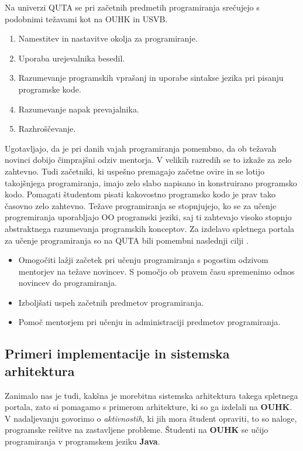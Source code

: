 Na univerzi QUTA se pri začetnih predmetih programiranja srečujejo s
podobnimi težavami kot na OUHK in USVB.

\begin{enumerate}
\tightlist
\item Namestitev in nastavitve okolja za programiranje.
\item Uporaba urejevalnika besedil.
\item Razumevanje programskih vprašanj in uporabe sintakse jezika pri
  pisanju programske kode.
\item Razumevanje napak prevajalnika.
\item Razhroščevanje.
\end{enumerate}

Ugotavljajo, da je pri danih vajah programiranja pomembno, da ob
težavah novinci dobijo čimprajšni odziv mentorja. V velikih razredih
se to izkaže za zelo zahtevno. Tudi začetniki, ki uspešno premagajo
začetne ovire in se lotijo takojšnjega programiranja, imajo zelo slabo
napisano in konstruirano programsko kodo. Pomagati študentom pisati
kakovostno programsko kodo je prav tako časovno zelo zahtevno. Težave
programiranja se stopnjujejo, ko se za učenje progremiranja uporabljajo
OO programski jeziki, saj ti zahtevajo visoko stopnjo
abstraktnega razumevanja programskih konceptov. Za izdelavo spletnega
portala za učenje programiranja so na QUTA bili pomembni naslednji
cilji \cite{thesisAWebP}.

\begin{itemize}
\item Omogočiti lažji začetek pri učenju programiranja s pogostim
  odzivom mentorjev na težave novincev. S pomočjo ob pravem času
  spremenimo odnos novincev do programiranja.
\item Izboljšati uspeh začetnih predmetov programiranja.
\item Pomoč mentorjem pri učenju in administraciji predmetov
  programiranja.
\end{itemize}

\subsection{Primeri implementacije in sistemska arhitektura}
\label{sec:sistemska_arhitektura_All}

Zanimalo nas je tudi, kakšna je morebitna sistemska arhitektura takega
spletnega portala, zato si pomagamo s primerom arhitekture, ki so ga
izdelali na \textbf{OUHK}.  V nadaljevanju govorimo o
\emph{aktivnostih}, ki jih mora študent opraviti, to so naloge,
programske rešitve na zastavljene probleme. Študenti na \textbf{OUHK}
se učijo programiranja v programskem jeziku \textbf{Java}.

